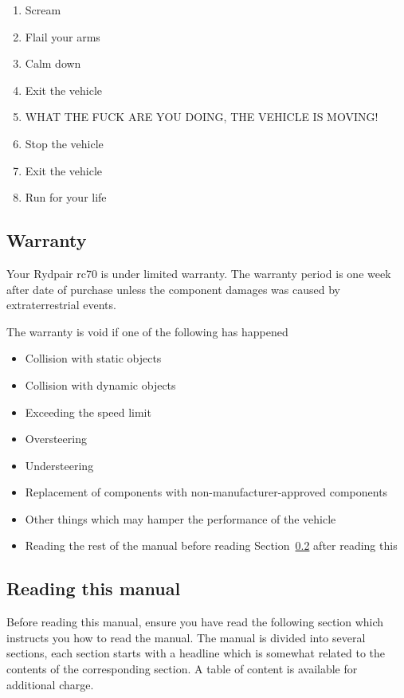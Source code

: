 \documentclass{article}
\newcommand{\carbrand}{Rydpair}
\newcommand{\carmodel}{rc70}
\begin{document}
    \begin{enumerate}
        \item{Scream}
        \item{Flail your arms}
        \item{Calm down}
        \item{Exit the vehicle}
        \item{WHAT THE FUCK ARE YOU DOING, THE VEHICLE IS MOVING!}
        \item{Stop the vehicle}
        \item{Exit the vehicle}
        \item{Run for your life}
    \end{enumerate}


    \subsection{Warranty}

    Your \carbrand{} \carmodel{} is under limited warranty. The warranty period is
    one week after date of purchase unless the component damages was caused by
    extraterrestrial events.

    The warranty is void if one of the following has happened
    \begin{itemize}
        \item{Collision with static objects}
        \item{Collision with dynamic objects}
        \item{Exceeding the speed limit}
        \item{Oversteering}
        \item{Understeering}
        \item{Replacement of components with non-manufacturer-approved components}
        \item{Other things which may hamper the performance of the vehicle}
        \item{Reading the rest of the manual before reading Section~\ref{sec:reading_the_manual}
            after reading this
        }
    \end{itemize}

    \twocolumn

    \subsection{Reading this manual}\label{sec:reading_the_manual}

    Before reading this manual, ensure you have read the following section which
    instructs you how to read the manual. The manual is divided into several
    sections, each section starts with a headline which is somewhat related to
    the contents of the corresponding section. A table of content is available
    for additional charge.
\end{document}
